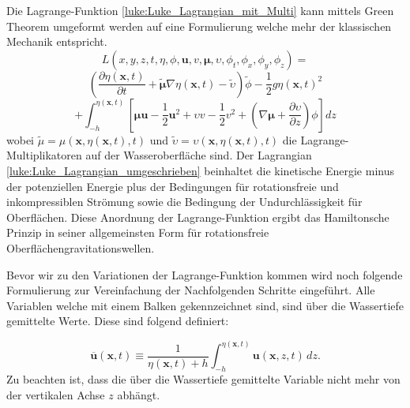 Die Lagrange-Funktion \eqref{luke:Luke_Lagrangian_mit_Multi} kann mittels Green Theorem umgeformt werden auf eine Formulierung welche mehr der klassischen Mechanik entspricht.
\[
L(x,y,z,t,\eta,\phi,\bm{u}, v, \bm{\mu},\upsilon,\phi_t,\phi_x,\phi_y,\phi_z)
=
\]
\[
\left(\frac{\partial \eta(\bm{x},t)}{\partial t}
+
\widetilde{\bm{\mu}} \nabla \eta(\bm{x},t)
-
\widetilde{\upsilon}\right) \widetilde{\phi}
-
\frac{1}{2} g \eta(\bm{x},t)^2
\]
\begin{equation}
	+
	\int_{-h}^{\eta(\bm{x},t)} \left[ \bm{\mu}  \bm{u} - \frac{1}{2} \bm{u}^2 + \upsilon v - \frac{1}{2} v^2 + \left(\nabla \bm{\mu} + \frac{\partial \upsilon}{\partial z}\right) \phi \right] dz
	\label{luke:Luke_Lagrangian_umgeschrieben}
\end{equation}
wobei $\tilde{\mu} = \mu(\bm{x},\eta(\bm{x},t),t)$ und $\tilde{\upsilon} = \upsilon(\bm{x},\eta(\bm{x},t),t)$ die Lagrange-Multiplikatoren auf der Wasseroberfläche sind.
Der Lagrangian \eqref{luke:Luke_Lagrangian_umgeschrieben} beinhaltet die kinetische Energie minus der potenziellen Energie plus der Bedingungen für rotationsfreie und inkompressiblen Strömung sowie die Bedingung der Undurchlässigkeit für Oberflächen.
Diese Anordnung der Lagrange-Funktion ergibt das Hamiltonsche Prinzip in seiner allgemeinsten Form für rotationsfreie Oberflächengravitationswellen.

Bevor wir zu den Variationen der Lagrange-Funktion kommen wird noch folgende Formulierung zur Vereinfachung der Nachfolgenden Schritte eingeführt.
Alle Variablen welche mit einem Balken gekennzeichnet sind, sind über die Wassertiefe gemittelte Werte. Diese sind folgend definiert:

\begin{equation}
	\overline{\bm{u}}(\bm{x}, t) \equiv \frac{1}{\eta(\bm{x}, t) + h} \int_{-h}^{\eta(\bm{x},t)} \bm{u}(\bm{x},z,t) \, dz.
	\label{luke:Mittelung_Wassertiefe}
\end{equation}
Zu beachten ist, dass die über die Wassertiefe gemittelte Variable nicht mehr von der vertikalen Achse $z$ abhängt.

